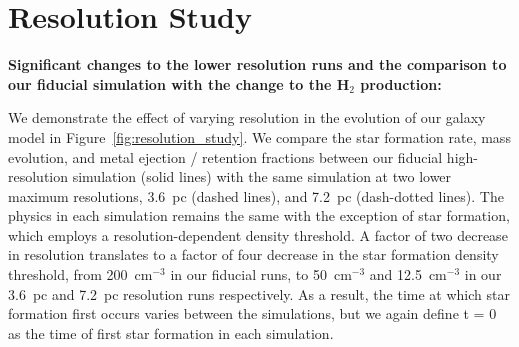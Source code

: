 \documentclass[fleqn,usenatbib,useAMS]{mnras}
\begin{document}
\setcounter{figure}{0}
\section{Resolution Study}
\label{appendix:resolution_study}

\textbf{Significant changes to the lower resolution runs and the comparison to our fiducial simulation with the change to the H$_2$ production:}

We demonstrate the effect of varying resolution in the evolution of our galaxy model in Figure~\ref{fig:resolution_study}. We compare the star formation rate, mass evolution, and metal ejection / retention fractions between our fiducial high-resolution simulation (solid lines) with the same simulation at two lower maximum resolutions, 3.6~pc (dashed lines), and 7.2~pc (dash-dotted lines). The physics in each simulation remains the same with the exception of star formation, which employs a resolution-dependent density threshold. A factor of two decrease in resolution translates to a factor of four decrease in the star formation density threshold, from 200~cm$^{-3}$ in our fiducial runs, to 50~cm$^{-3}$ and 12.5~cm$^{-3}$ in our 3.6~pc and 7.2~pc resolution runs respectively. As a result, the time at which star formation first occurs varies between the simulations, but we again define t = 0 as the time of first star formation in each simulation.
\end{document}
